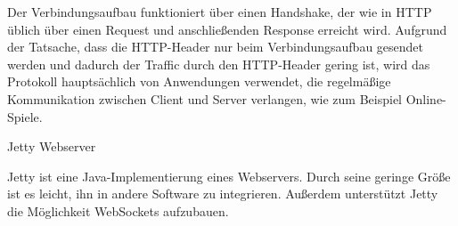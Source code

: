 Der Verbindungsaufbau funktioniert über einen Handshake, der wie in HTTP üblich über einen Request und anschließenden Response erreicht wird. Aufgrund der Tatsache, dass die HTTP-Header nur beim Verbindungsaufbau gesendet werden und dadurch der Traffic durch den HTTP-Header gering ist, wird das Protokoll hauptsächlich von Anwendungen verwendet, die regelmäßige Kommunikation zwischen Client und Server verlangen, wie zum Beispiel Online-Spiele.



Jetty Webserver

Jetty ist eine Java-Implementierung eines Webservers. Durch seine geringe Größe ist es leicht, ihn in andere Software zu integrieren. Außerdem unterstützt Jetty die Möglichkeit WebSockets aufzubauen.
